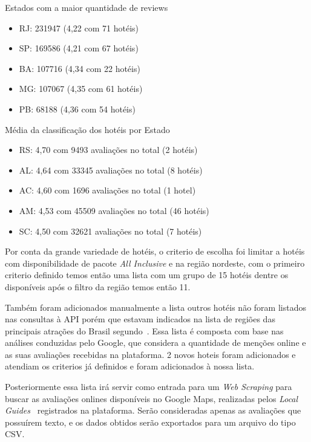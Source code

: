 Estados com a maior quantidade de reviews

\begin{itemize}
	\item RJ: 231947 (4,22 com 71 hotéis)
	\item SP: 169586 (4,21 com 67 hotéis)
	\item BA: 107716 (4,34 com 22 hotéis)
	\item MG: 107067 (4,35 com 61 hotéis)
	\item PB: 68188 (4,36 com 54 hotéis)
\end{itemize}


Média da classificação dos hotéis por Estado

\begin{itemize}
	\item RS: 4,70 com 9493 avaliações no total (2 hotéis)
	\item AL: 4,64 com 33345 avaliações no total (8 hotéis)
	\item AC: 4,60 com 1696 avaliações no total (1 hotel)
	\item AM: 4,53 com 45509 avaliações no total (46 hotéis)
	\item SC: 4,50 com 32621 avaliações no total (7 hotéis)
\end{itemize}

Por conta da grande variedade de hotéis, o criterio de escolha foi limitar a hotéis com disponibilidade de pacote \emph{All Inclusive} e na região nordeste, com o primeiro criterio definido temos então uma lista com um grupo de 15 hotéis dentre os disponíveis após o filtro da região temos então 11.

Também foram adicionados manualmente a lista outros hotéis não foram listados nas consultas à API porém que estavam indicados na lista de regiões das principais atrações do Brasil segundo~\cite{googleFlights2022destinos}. Essa lista é composta com base nas análises conduzidas pelo Google, que considera a quantidade de menções online e as suas avaliações recebidas na plataforma. 2 novos hoteis foram adicionados e atendiam os criterios já definidos e foram adicionados à nossa lista.

Posteriormente essa lista irá servir como entrada para um \emph{Web Scraping} para buscar as avaliações onlines disponíveis no Google Maps, realizadas pelos \emph{Local Guides}~\cite{google2022localguides} registrados na plataforma. Serão consideradas apenas as avaliações que possuírem texto, e os dados obtidos serão exportados para um arquivo do tipo CSV.

